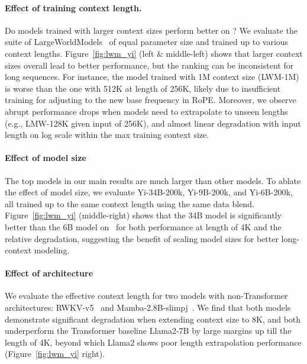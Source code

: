 \paragraph{Effect of training context length.} Do models trained with larger context sizes perform better on ? We evaluate the suite of LargeWorldModels~\citep[][LWM]{lwm} of equal parameter size and trained up to various context lengths. Figure~\ref{fig:lwm_yi} (left \& middle-left) shows that larger context sizes overall lead to better performance, but the ranking can be inconsistent for long sequences. For instance, the model trained with 1M context size (LWM-1M) is worse than the one with 512K at length of 256K, likely due to insufficient training for adjusting to the new base frequency in RoPE. Moreover, we observe abrupt performance drops when models need to extrapolate to unseen lengths (e.g., LMW-128K given input of 256K), and almost linear degradation with input length on log scale within the max training context size.
\paragraph{Effect of model size} The top models in our main results are much larger than other models. To ablate the effect of model size, we evaluate Yi-34B-200k, Yi-9B-200k, and Yi-6B-200k, all trained up to the same context length using the same data blend. Figure~\ref{fig:lwm_yi} (middle-right) shows that the 34B model is significantly better than the 6B model on ~for both performance at length of 4K and the relative degradation, suggesting the benefit of scaling model sizes for better long-context modeling.
% 
\paragraph{Effect of architecture}  We evaluate the effective context length for two models with non-Transformer architectures: RWKV-v5~\citep{rwkv} and Mamba-2.8B-slimpj~\citep{mamba}. We find that both models demonstrate significant degradation when extending context size to 8K, and both underperform the Transformer baseline Llama2-7B by large margins up till the length of 4K, beyond which Llama2 shows poor length extrapolation performance (Figure~\ref{fig:lwm_yi} right).





